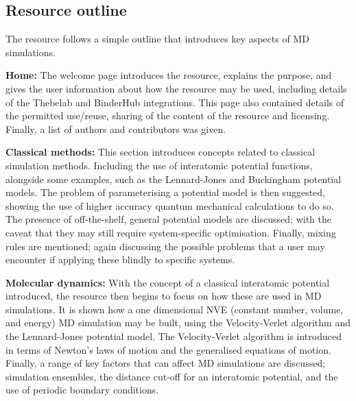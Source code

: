 \subsection{Resource outline}
The resource follows a simple outline that introduces key aspects of MD simulations.

\textbf{Home:} The welcome page introduces the resource, explains the purpose, and gives the user information about how the resource may be used, including details of the Thebelab and BinderHub integrations.
This page also contained details of the permitted use/reuse, sharing of the content of the resource and licensing.
Finally, a list of authors and contributors was given.

\textbf{Classical methods:} This section introduces concepts related to classical simulation methods.
Including the use of interatomic potential functions, alongside some examples, such as the Lennard-Jones and Buckingham potential models.\autocite{lennard-jones_determination_1924,buckingham_classical_1938}
The problem of parameterising a potential model is then suggested, showing the use of higher accuracy quantum mechanical calculations to do so.
The presence of off-the-shelf, general potential models are discussed; with the caveat that they may still require system-specific optimisation.
Finally, mixing rules are mentioned; again discussing the possible problems that a user may encounter if applying these blindly to specific systems.

\textbf{Molecular dynamics:} With the concept of a classical interatomic potential introduced, the resource then begins to focus on how these are used in MD simulations.
It is shown how a one dimensional NVE (constant number, volume, and energy) MD simulation may be built, using the Velocity-Verlet algorithm and the Lennard-Jones potential model.\autocite{swope_computer_1982,lennard-jones_determination_1924}
The Velocity-Verlet algorithm is introduced in terms of Newton's laws of motion and the generalised equations of motion.
Finally, a range of key factors that can affect MD simulations are discussed; simulation ensembles, the distance cut-off for an interatomic potential, and the use of periodic boundary conditions.

